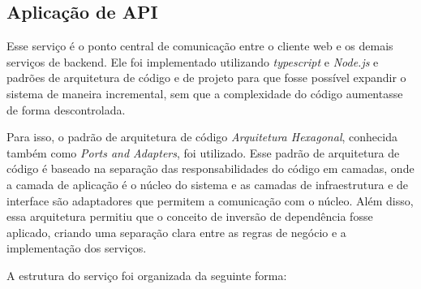 \subsection{Aplicação de API}
\label{subsec:aplicacaoDeAPI}

Esse serviço é o ponto central de comunicação entre o cliente web e os demais serviços de backend. 
Ele foi implementado utilizando \textit{typescript} e \textit{Node.js} e padrões de arquitetura de código e de projeto para que fosse possível expandir o sistema de maneira incremental, sem que a complexidade do código aumentasse de forma descontrolada.

Para isso, o padrão de arquitetura de código \textit{Arquitetura Hexagonal}, conhecida também como \textit{Ports and Adapters}, foi utilizado. Esse padrão de arquitetura de código é baseado na separação das responsabilidades do código em camadas, onde a camada de aplicação é o núcleo do sistema e as camadas de infraestrutura e de interface são adaptadores que permitem a comunicação com o núcleo. Além disso, essa arquitetura permitiu que o conceito de inversão de dependência fosse aplicado, criando uma separação clara entre as regras de negócio e a implementação dos serviços.

A estrutura do serviço foi organizada da seguinte forma:

